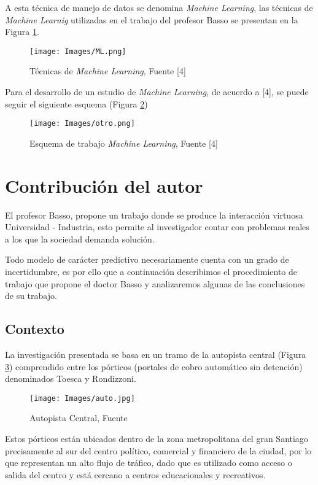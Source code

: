 \documentclass{article}
\begin{document}
A esta técnica de manejo de datos se denomina \textit{Machine Learning}, las técnicas de \textit{Machine Learnig} utilizadas en el trabajo del profesor Basso se presentan en la Figura \ref{ML}.

\begin{figure}[H]
\texttt{[image: Images/ML.png]}
\centering
\caption{Técnicas de \textit{Machine Learning}, Fuente [4] }
\label{ML}
\end{figure}

Para el desarrollo de un estudio de \textit{Machine Learning}, de acuerdo a [4], se puede seguir el siguiente esquema (Figura \ref{otro})

\begin{figure}[H]
\texttt{[image: Images/otro.png]}
\centering
\caption{Esquema de trabajo \textit{Machine Learning}, Fuente [4] }
\label{otro}
\end{figure}

\section{Contribución del autor}

El profesor Basso, propone un trabajo donde se produce la interacción virtuosa Universidad - Industria, esto permite al investigador contar con problemas reales a los que la sociedad demanda solución.

Todo modelo de carácter predictivo necesariamente cuenta con un grado de incertidumbre, es por ello que a continuación describimos el procedimiento de trabajo que propone el doctor Basso y analizaremos algunas de las conclusiones de su trabajo.

\subsection{Contexto}

La investigación presentada se basa en un tramo de la autopista central (Figura \ref{auto}) comprendido entre los pórticos (portales de cobro automático sin detención) denominados Toesca y Rondizzoni.

\begin{figure}[H]
\texttt{[image: Images/auto.jpg]}
\centering
\caption{Autopista Central, Fuente \cite{article1}}
\label{auto}
\end{figure}

Estos pórticos están ubicados dentro de la zona metropolitana del gran Santiago precisamente al sur del centro político, comercial y financiero de la ciudad, por lo que representan un alto flujo de tráfico, dado que es utilizado como acceso o salida del centro y está cercano a centros educacionales y recreativos. 
\end{document}
